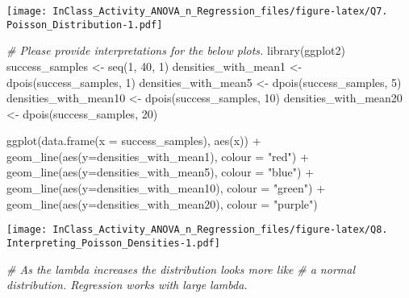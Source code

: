 \documentclass[
]{article}
\newenvironment{Shaded}{\begin{snugshade}}{\end{snugshade}}
\newcommand{\AttributeTok}[1]{\textcolor[rgb]{0.77,0.63,0.00}{#1}}
\newcommand{\CommentTok}[1]{\textcolor[rgb]{0.56,0.35,0.01}{\textit{#1}}}
\newcommand{\DecValTok}[1]{\textcolor[rgb]{0.00,0.00,0.81}{#1}}
\newcommand{\FunctionTok}[1]{\textcolor[rgb]{0.00,0.00,0.00}{#1}}
\newcommand{\NormalTok}[1]{#1}
\newcommand{\OtherTok}[1]{\textcolor[rgb]{0.56,0.35,0.01}{#1}}
\newcommand{\SpecialCharTok}[1]{\textcolor[rgb]{0.00,0.00,0.00}{#1}}
\newcommand{\StringTok}[1]{\textcolor[rgb]{0.31,0.60,0.02}{#1}}
\begin{document}
\texttt{[image: InClass\_Activity\_ANOVA\_n\_Regression\_files/figure-latex/Q7. Poisson\_Distribution-1.pdf]}

\begin{Shaded}
\begin{Highlighting}[]
\CommentTok{\# Please provide interpretations for the below plots. }
\FunctionTok{library}\NormalTok{(ggplot2)}
\NormalTok{success\_samples }\OtherTok{\textless{}{-}} \FunctionTok{seq}\NormalTok{(}\DecValTok{1}\NormalTok{, }\DecValTok{40}\NormalTok{, }\DecValTok{1}\NormalTok{)}
\NormalTok{densities\_with\_mean1 }\OtherTok{\textless{}{-}} \FunctionTok{dpois}\NormalTok{(success\_samples, }\DecValTok{1}\NormalTok{)}
\NormalTok{densities\_with\_mean5 }\OtherTok{\textless{}{-}} \FunctionTok{dpois}\NormalTok{(success\_samples, }\DecValTok{5}\NormalTok{)}
\NormalTok{densities\_with\_mean10 }\OtherTok{\textless{}{-}} \FunctionTok{dpois}\NormalTok{(success\_samples, }\DecValTok{10}\NormalTok{)}
\NormalTok{densities\_with\_mean20 }\OtherTok{\textless{}{-}} \FunctionTok{dpois}\NormalTok{(success\_samples, }\DecValTok{20}\NormalTok{)}

\FunctionTok{ggplot}\NormalTok{(}\FunctionTok{data.frame}\NormalTok{(}\AttributeTok{x =}\NormalTok{ success\_samples), }\FunctionTok{aes}\NormalTok{(x)) }\SpecialCharTok{+}
  \FunctionTok{geom\_line}\NormalTok{(}\FunctionTok{aes}\NormalTok{(}\AttributeTok{y=}\NormalTok{densities\_with\_mean1), }\AttributeTok{colour =} \StringTok{"red"}\NormalTok{) }\SpecialCharTok{+}
  \FunctionTok{geom\_line}\NormalTok{(}\FunctionTok{aes}\NormalTok{(}\AttributeTok{y=}\NormalTok{densities\_with\_mean5), }\AttributeTok{colour =} \StringTok{"blue"}\NormalTok{) }\SpecialCharTok{+}
  \FunctionTok{geom\_line}\NormalTok{(}\FunctionTok{aes}\NormalTok{(}\AttributeTok{y=}\NormalTok{densities\_with\_mean10), }\AttributeTok{colour =} \StringTok{"green"}\NormalTok{) }\SpecialCharTok{+}
  \FunctionTok{geom\_line}\NormalTok{(}\FunctionTok{aes}\NormalTok{(}\AttributeTok{y=}\NormalTok{densities\_with\_mean20), }\AttributeTok{colour =} \StringTok{"purple"}\NormalTok{)}
\end{Highlighting}
\end{Shaded}

\texttt{[image: InClass\_Activity\_ANOVA\_n\_Regression\_files/figure-latex/Q8. Interpreting\_Poisson\_Densities-1.pdf]}

\begin{Shaded}
\begin{Highlighting}[]
\CommentTok{\#\textquotesingle{} As the lambda increases the distribution looks more like}
\CommentTok{\#\textquotesingle{} a normal distribution. Regression works with large lambda.}
\end{Highlighting}
\end{Shaded}
\end{document}
